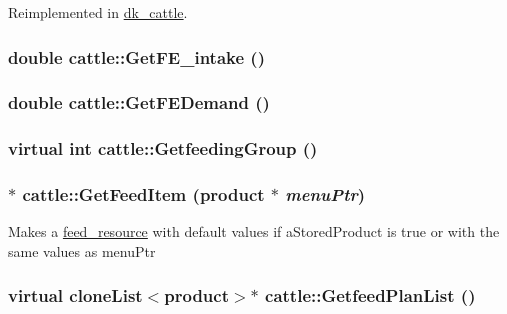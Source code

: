Reimplemented in \hyperlink{classdk__cattle_a95c52a8ad9b041ebbf28613c7f1b144a}{dk\_\-cattle}.\hypertarget{classcattle_a808e0639e48ba92d545d83ca1fd21834}{
\subsubsection[{GetFE\_\-intake}]{\setlength{\rightskip}{0pt plus 5cm}double cattle::GetFE\_\-intake ()}}
\label{classcattle_a808e0639e48ba92d545d83ca1fd21834}
\hypertarget{classcattle_ae44a251b975bfb404a8c01bdccc1fb22}{
\subsubsection[{GetFEDemand}]{\setlength{\rightskip}{0pt plus 5cm}double cattle::GetFEDemand ()}}
\label{classcattle_ae44a251b975bfb404a8c01bdccc1fb22}
\hypertarget{classcattle_a2f1b1ea50c4b0bd9aaea20a3f715645a}{
\subsubsection[{GetfeedingGroup}]{\setlength{\rightskip}{0pt plus 5cm}virtual int cattle::GetfeedingGroup ()}}
\label{classcattle_a2f1b1ea50c4b0bd9aaea20a3f715645a}
\hypertarget{classcattle_a30cf96265a9fbfec7859bd1e62730088}{
\subsubsection[{GetFeedItem}]{ $\ast$ cattle::GetFeedItem ({\bf product} $\ast$ {\em menuPtr})}}
\label{classcattle_a30cf96265a9fbfec7859bd1e62730088}
Makes a \hyperlink{classfeed__resource}{feed\_\-resource} with default values if aStoredProduct is true or with the same values as menuPtr \hypertarget{classcattle_ac087867a732ba9ae7821d1d61928908f}{
\subsubsection[{GetfeedPlanList}]{\setlength{\rightskip}{0pt plus 5cm}virtual {\bf cloneList}$<${\bf product}$>$$\ast$ cattle::GetfeedPlanList ()}}
